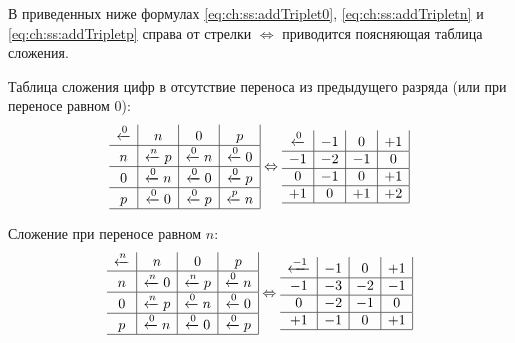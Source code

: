 В приведенных ниже формулах \eqref{eq:ch:ss:addTriplet0}, \eqref{eq:ch:ss:addTripletn} и \eqref{eq:ch:ss:addTripletp} справа от стрелки $\Leftrightarrow$ приводится поясняющая таблица сложения.

Таблица сложения цифр в отсутствие переноса из предыдущего разряда (или при переносе равном $0$):
\begin{equation}
    \label{eq:ch:ss:addTriplet0}
    \begin{array}[c]{c|c|c|c|}
        \xleftarrow{0} & n & 0 & p \\
        \hline
        n & \xleftarrow{n}p & \xleftarrow{0}n & \xleftarrow{0}0 \\
        \hline
        0 & \xleftarrow{0}n & \xleftarrow{0}0 & \xleftarrow{0}p \\
        \hline
        p & \xleftarrow{0}0 & \xleftarrow{0}p & \xleftarrow{p}n \\
        \hline
    \end{array}
    \Leftrightarrow
    \begin{array}[c]{c|c|c|c|}
        \xleftarrow{0}  & -1 & 0 & +1 \\
        \hline
        -1 & -2 & -1 & 0 \\
        \hline
        0 & -1 & 0 & +1 \\
        \hline
        +1 & 0 & +1 & +2 \\
        \hline
    \end{array}
\end{equation}

Сложение при переносе равном $n$:
\begin{equation}
    \label{eq:ch:ss:addTripletn}
    \begin{array}[c]{c|c|c|c|}
        \xleftarrow{n} & n  & 0 & p \\
        \hline
        n & \xleftarrow{n}0 & \xleftarrow{n}p & \xleftarrow{0}n \\
        \hline
        0 & \xleftarrow{n}p & \xleftarrow{0}n & \xleftarrow{0}0 \\
        \hline
        p & \xleftarrow{0}n & \xleftarrow{0}0 & \xleftarrow{0}p\\
        \hline
    \end{array}
    \Leftrightarrow
    \begin{array}[c]{c|c|c|c|}
        \xleftarrow{-1}  & -1 & 0 & +1 \\
        \hline
        -1 & -3 & -2 & -1 \\
        \hline
        0 & -2 & -1 & 0 \\
        \hline
        +1 & -1 & 0 & +1\\
        \hline
    \end{array}
\end{equation}

